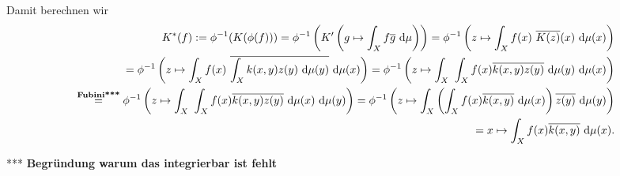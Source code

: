 \begin{solution}
  Damit berechnen wir
  \begin{align}
      K^*(f) := \phi^{-1}(K(\phi(f))) = \phi^{-1}\left(K^\prime\left(g \mapsto \int_X f\overline g ~\mathrm{d}\mu\right)\right)
      = \phi^{-1}\left(z \mapsto \int_X f(x) ~\overline{K(z)}(x) ~\mathrm{d}\mu(x)\right) \\
      = \phi^{-1}\left(z \mapsto \int_X f(x)
      ~\overline{\int_X k(x,y) z(y) ~\mathrm{d}\mu(y)}
      ~\mathrm{d}\mu(x)\right)
      = \phi^{-1}\left(z \mapsto \int_X
      ~\int_X f(x) \overline{k(x,y)} \overline{z(y)} ~\mathrm{d}\mu(y)
      ~\mathrm{d}\mu(x)\right) \\
      \stackrel{\text{\textbf{Fubini***}}}{=} \phi^{-1}\left(z \mapsto \int_X
      ~\int_X f(x) \overline{k(x,y)} \overline{z(y)} ~\mathrm{d}\mu(x)
      ~\mathrm{d}\mu(y)\right)
      = \phi^{-1}\left(z \mapsto \int_X
      \left(\int_X f(x) \overline{k(x,y)} ~\mathrm{d}\mu(x) \right) \overline{z(y)}
      ~\mathrm{d}\mu(y)\right) \\
      = x \mapsto \int_X f(x) \overline{k(x,y)} ~\mathrm{d}\mu(x).
  \end{align}

  *** \textbf{Begründung warum das integrierbar ist fehlt}


\end{solution}
